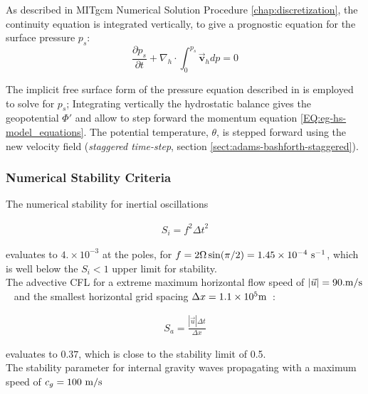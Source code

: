 As described in MITgcm Numerical Solution Procedure \ref{chap:discretization}, 
the continuity equation is integrated vertically, to give a prognostic
equation for the surface pressure $p_s$:
\begin{equation}
\frac{\partial p_s}{\partial t} + \nabla_{h}\cdot \int_{0}^{p_s} \vec{\mathbf{v}}_h dp
= 0
\end{equation}

The implicit free surface form of the pressure equation described in 
\cite{marshall:97a} is employed to solve for $p_s$; 
Integrating vertically the hydrostatic balance 
gives the geopotential $\Phi'$ and allow to step forward the momentum equation
\ref{EQ:eg-hs-model_equations}.
The potential temperature, $\theta$, is stepped forward using the 
new velocity field ({\it staggered time-step}, section 
\ref{sect:adams-bashforth-staggered}).
\\

\subsubsection{Numerical Stability Criteria}
\label{www:tutorials}

\noindent The numerical stability for inertial oscillations
\cite{adcroft:95} 

\begin{eqnarray}
\label{EQ:eg-hs-inertial_stability}
S_{i} = f^{2} {\Delta t}^2
\end{eqnarray}

\noindent evaluates to $4.\times10^{-3}$ at the poles, 
for $f=2\Omega\sin(\pi / 2) =1.45\times10^{-4}~{\rm s}^{-1}$, 
which is well below the $S_{i} < 1$ upper limit for stability.
\\

\noindent The advective CFL \cite{adcroft:95} 
for a extreme maximum horizontal flow speed of $ | \vec{u} | = 90. {\rm m/s}$~ 
and the smallest horizontal grid spacing $ \Delta x = 1.1\times10^5 {\rm m}$~:

\begin{eqnarray}
\label{EQ:eg-hs-cfl_stability}
S_{a} = \frac{| \vec{u} | \Delta t}{ \Delta x}
\end{eqnarray}

\noindent evaluates to $0.37$, which is close to the stability 
limit of 0.5.
\\

\noindent The stability parameter for internal gravity waves propagating
with a maximum speed of $c_{g}=100~{\rm m/s}$
\cite{adcroft:95}

